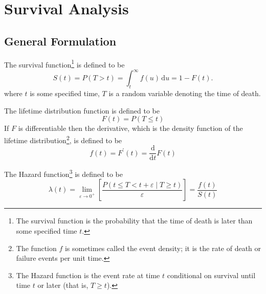 \chapter{Survival Analysis}

\section{General Formulation}

\begin{definition}
	The survival function\footnote{The survival function is the probability that the time of death is later than some specified time $t$.} is defined to be
	\begin{equation}
		S(t)=P(T>t)=\int_{t}^{\infty}f(u)\,\mathrm{d}u=1-F(t) .
	\end{equation}
	where $t$ is some specified time, $T$ is a random variable denoting the time of death.
\end{definition}

\begin{definition}
	The lifetime distribution function is defined to be
	\begin{equation}
		F(t)=P(T\leq t)
	\end{equation}
	If $F$ is differentiable then the derivative, which is the density function of the lifetime distribution\footnote{The function $f$ is sometimes called the event density; it is the rate of death or failure events per unit time.}, is defined to be
	\begin{equation}
		f(t)=F^{\prime}(t)=\frac{\mathrm{d}}{\mathrm{d}t}F(t)
	\end{equation}
\end{definition}

\begin{definition}
	The Hazard function\footnote{The Hazard function is the event rate at time $t$ conditional on survival until time $t$ or later (that is, $T\geq t$).} is defined to be
	\begin{equation}
		\lambda(t)=\lim_{\varepsilon\rightarrow 0^{+}}\left[\frac{P(t\leq T<t+\varepsilon\mid T\geq t)}{\varepsilon}\right]=\frac{f(t)}{S(t)}
	\end{equation}
\end{definition}

